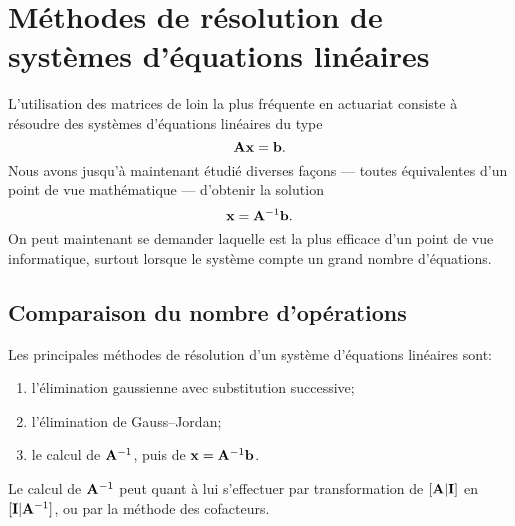 \chapter{Méthodes de résolution de systèmes d'équations linéaires}
\label{chap:decomposition}

L'utilisation des matrices de loin la plus fréquente en actuariat
consiste à résoudre des systèmes d'équations linéaires du type
\begin{displaymath}
  \mathbf{A} \mathbf{x} = \mathbf{b}.
\end{displaymath}
Nous avons jusqu'à maintenant étudié diverses façons --- toutes
équivalentes d'un point de vue mathématique --- d'obtenir la solution
\begin{displaymath}
  \mathbf{x} = \mathbf{A}^{-1} \mathbf{b}.
\end{displaymath}
On peut maintenant se demander laquelle est la plus efficace d'un
point de vue informatique, surtout lorsque le système compte un grand
nombre d'équations.


\section{Comparaison du nombre d'opérations}
\label{sec:decomposition:nombre_operations}

Les principales méthodes de résolution d'un système d'équations
linéaires sont:
\begin{enumerate}
\item l'élimination gaussienne avec substitution successive;
\item l'élimination de Gauss--Jordan;
\item le calcul de $\mathbf{A}^{-1}$, puis de $\mathbf{x} = \mathbf{A}^{-1}
  \mathbf{b}$.
\end{enumerate}
Le calcul de $\mathbf{A}^{-1}$ peut quant à lui s'effectuer par
transformation de $[\mathbf{A}|\mathbf{I}]$ en $[\mathbf{I}|\mathbf{A}^{-1}]$, ou
par la méthode des cofacteurs.

